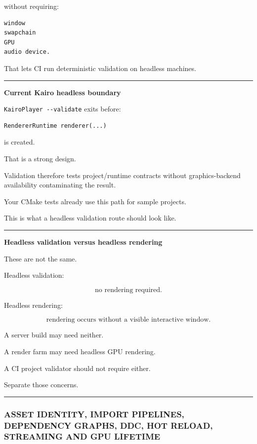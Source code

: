 without requiring:

\begin{verbatim}
window
swapchain
GPU
audio device.
\end{verbatim}

That lets CI run deterministic validation on headless machines.

\begin{center}\rule{0.5\linewidth}{0.5pt}\end{center}

\textbf{Current Kairo headless boundary}

\texttt{KairoPlayer\ -\/-validate} exits before:

\begin{verbatim}
RendererRuntime renderer(...)
\end{verbatim}

is created.

That is a strong design.

Validation therefore tests project/runtime contracts without graphics-backend availability contaminating the result.

Your CMake tests already use this path for sample projects.

This is what a headless validation route should look like.

\begin{center}\rule{0.5\linewidth}{0.5pt}\end{center}

\textbf{Headless validation versus headless rendering}

These are not the same.

Headless validation:

\[
\text{no rendering required}.
\]

Headless rendering:

\[
\text{rendering occurs without a visible interactive window}.
\]

A server build may need neither.

A render farm may need headless GPU rendering.

A CI project validator should not require either.

Separate those concerns.

\begin{center}\rule{0.5\linewidth}{0.5pt}\end{center}

\subsubsection{ASSET IDENTITY, IMPORT PIPELINES, DEPENDENCY GRAPHS, DDC, HOT RELOAD, STREAMING AND GPU LIFETIME}\label{asset-identity-import-pipelines-dependency-graphs-ddc-hot-reload-streaming-and-gpu-lifetime}

